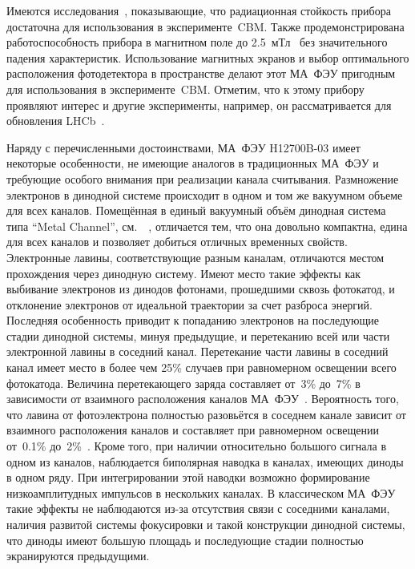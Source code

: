 Имеются исследования~\cite{MAPMTRADHARD, THECBMRICHPROJ16, THECBMRICHDET16}, показывающие, что радиационная стойкость прибора достаточна для использования в эксперименте~CBM. Также продемонстрирована работоспособность прибора в магнитном поле до 2.5~мТл~\cite{CALVI} без значительного падения характеристик. Использование магнитных экранов и выбор оптимального расположения фотодетектора в пространстве делают этот МА~ФЭУ пригодным для использования в эксперименте~CBM. Отметим, что к этому прибору проявляют интерес и другие эксперименты, например, он рассматривается для обновления LHCb~\cite{CALVI}.

Наряду с перечисленными достоинствами, МА~ФЭУ H12700B-03 имеет некоторые особенности, не имеющие аналогов в традиционных МА~ФЭУ и требующие особого внимания при реализации канала считывания. Размножение электронов в динодной системе происходит в одном и том же вакуумном объеме для всех каналов. Помещённая в единый вакуумный объём динодная система типа ``Metal Channel'', см.~~\cite{MCdynodeSys}, отличается тем, что она довольно компактна, едина для всех каналов и позволяет добиться отличных временных свойств. Электронные лавины, соответствующие разным каналам, отличаются местом прохождения через динодную систему. Имеют место такие эффекты как выбивание электронов из динодов фотонами, прошедшими сквозь фотокатод, и отклонение электронов от идеальной траектории за счет разброса энергий. Последняя особенность приводит к попаданию электронов на последующие стадии динодной системы, минуя предыдущие, и перетеканию всей или части электронной лавины в соседний канал. Перетекание части лавины в соседний канал имеет место в более чем 25\% случаев при равномерном освещении всего фотокатода. Величина перетекающего заряда составляет от~3\% до~7\% в зависимости от взаимного расположения каналов МА~ФЭУ~\cite{CALVI}. Вероятность того, что лавина от фотоэлектрона полностью разовьётся в соседнем канале зависит от взаимного расположения каналов и составляет при равномерном освещении от~0.1\% до~2\%~\cite{KOPFERDISS}. Кроме того, при наличии относительно большого сигнала в одном из каналов, наблюдается биполярная наводка в каналах, имеющих диноды в одном ряду. При интегрировании этой наводки возможно формирование низкоамплитудных импульсов в нескольких каналах. В классическом МА~ФЭУ такие эффекты не наблюдаются из-за отсутствия связи с соседними каналами, наличия развитой системы фокусировки и такой конструкции динодной системы, что диноды имеют большую площадь и последующие стадии полностью экранируются предыдущими.

